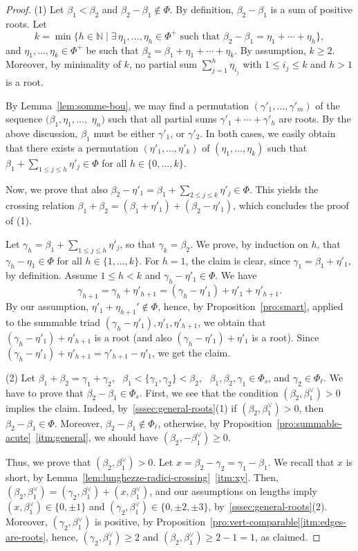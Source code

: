 \documentclass[ALCO,published]{cedram}
\theoremstyle{plain}
\newcommand\nat{\mathbb N}
\newcommand\be{\beta}
\newcommand\ga{\gamma}
\renewcommand{\leq}{\leqslant}
\begin{document}
\begin{proof}
(1) Let $\be_1< \be_2$ and $\be_2-\be_1\not\in\Phi$. By definition, $\be_2-\be_1$ is a sum of positive roots. Let 
$$
k=\min\{h\in \nat \mid \exists\, \eta_1,\dots, \eta_h\in \Phi^+ \text{ such that }  \be_2-\be_1=\eta_1+\cdots+\eta_h\},
$$ 
and $\eta_1,\dots, \eta_k\in \Phi^+$ be such that $\be_2=\be_1+\eta_1+\cdots+\eta_k$. 
By assumption, $k\geq 2$. 
Moreover, by minimality of $k$, no partial sum $\sum_{j=1}^h\eta_{i_j}$ with $1\leq i_j\leq k$ and $h> 1$  is a root.
\par
By Lemma~\ref{lem:somme-bou},  we may find a permutation $(\ga'_1, \dots, \ga'_m)$ of the sequence $(\be_1, \eta_1, \dots,$ $\eta_n)$ such that all partial sums $\ga'_1+\cdots+\ga'_h$ are roots.
By the above discussion,  $\be_1$ must be either $\ga'_1$, or $\ga'_2$.
In both cases, we easily obtain that there exists a permutation $(\eta'_1, \dots, \eta'_k)$ of $(\eta_1, \dots, \eta_k)$ such that $\be_1+\sum\limits_{1\leq j\leq h}\eta'_j\in \Phi$ for all $h\in \{0, \dots, k\}$.
\par
Now, we prove that also $\be_2-\eta'_1=\be_1+\sum\limits_{2\leq j\leq k}\eta'_j\in \Phi$. 
This yields the crossing relation  $\be_1+\be_2=(\be_1+\eta'_1)+(\be_2-\eta'_1)$, which concludes the proof of (1). 
\par
Let $\ga_h=\be_1+\sum\limits_{1\leq j\leq h}\eta'_j$,
so that $\ga_k=\be_2$. 
We prove, by induction on $h$, that $\ga_h-\eta_1\in \Phi$ for all $h\in \{1, \dots, k\}$. 
For $h=1$, the claim is clear, since $\ga_1=\be_1+\eta'_1$, by definition.
Assume $1\leq h<k$ and   $\ga_h-\eta'_1\in \Phi$. 
We have 
$$
\ga_{h+1}=\ga_h+\eta'_{h+1}=(\ga_h-\eta'_1)+\eta'_1+\eta'_{h+1}.
$$
By our assumption, $\eta'_1+\eta_{h+1}'\not\in \Phi$, hence, by  Proposition~\ref{pro:smart}, applied to the summable triad $(\ga_h-\eta'_1), \eta'_1, \eta'_{h+1}$, we obtain that $(\ga_h-\eta'_1)+\eta'_{h+1}$ is a root (and also $(\ga_h-\eta'_1)+ \eta'_1$ is a root).
Since $(\ga_h-\eta'_1)+\eta'_{h+1}=\ga'_{h+1}-\eta'_1$, we get the claim.

(2)  Let $\be_1+\be_2=\ga_1+\ga_2$, \ $\be_1< \{\ga_1, \ga_2\}< \be_2$, \ $\be_1, \be_2, \ga_1\in \Phi_s$,  and  $\ga_2\in \Phi_\ell$. 
We have to prove that $\be_2-\be_1\in \Phi_s$.  
First, we see that the condition $(\be_2, \be_1^\vee)>0$ implies the claim.
Indeed, by~\ref{sssec:general-roots}(1) if $(\be_2, \be_1^\vee)>0$, then $\be_2-\be_1\in \Phi$.  
Moreover, $\be_2-\be_1\not\in \Phi_\ell$, otherwise, by Proposition~\ref{pro:summable-acute}~\ref{itm:general}, we should have $(\be_2, -\be_1^\vee)\geq 0$.
\par
Thus, we prove that $(\be_2, \be_1^\vee)>0$.
Let $x=\be_2-\ga_2=\ga_1-\be_1$. 
We recall that $x$ is short, by Lemma~\ref{lem:lunghezze-radici-crossing}~\ref{itm:xy}. 
Then, $(\be_2, \be_1^\vee)=(\ga_2, \be_1^\vee)+(x, \be_1^\vee)$, and our assumptions on lengths imply $(x, \be_1^\vee)\in \{0, \pm 1\}$ and $(\ga_2, \be_1^\vee)\in \{0, \pm2, \pm 3\}$, by~\ref{sssec:general-roots}(2).
Moreover, $(\ga_2, \be_1^\vee)$ is positive, by Proposition~\ref{pro:vert-comparable}\ref{itm:edges-are-roots}, hence,  $(\ga_2, \be_1^\vee)\geq 2$ and $(\be_2, \be_1^\vee)\geq 2-1=1$, as claimed.


\end{proof}
\end{document}
